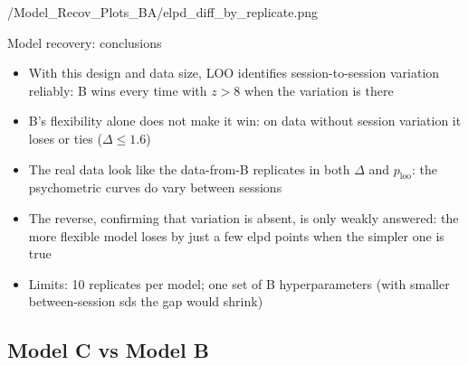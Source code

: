   {\plotsB/Model_Recov_Plots_BA/elpd_diff_by_replicate.png}

\begin{frame}{Model recovery: conclusions}
  \begin{itemize}
    \item With this design and data size, LOO identifies session-to-session variation
          reliably: B wins every time with $z > 8$ when the variation is there
    \item B's flexibility alone does not make it win: on data without session variation it
          loses or ties ($\Delta \le 1.6$)
    \item The real data look like the data-from-B replicates in both $\Delta$ and $p_\text{loo}$:
          the psychometric curves do vary between sessions
    \item The reverse, confirming that variation is absent, is only weakly answered: the more
          flexible model loses by just a few elpd points when the simpler one is true
    \item Limits: 10 replicates per model; one set of B hyperparameters (with smaller
          between-session sds the gap would shrink)
  \end{itemize}
\end{frame}

\subsection{Model C vs Model B}

